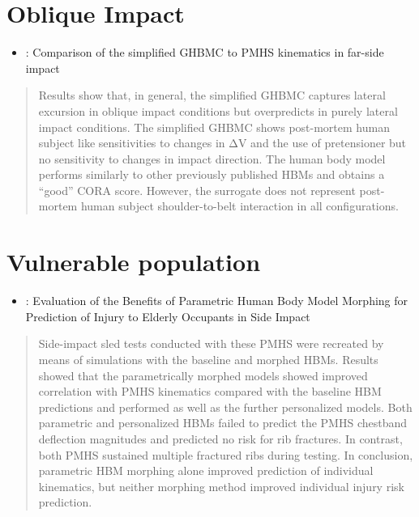 \documentclass[]{book}
\providecommand{\tightlist}{%
  \setlength{\itemsep}{0pt}\setlength{\parskip}{0pt}}
\begin{document}
\citep{Hwang2019}

\hypertarget{oblique-impact}{%
\section{Oblique Impact}\label{oblique-impact}}

\begin{itemize}
\tightlist
\item
  \citet{Perez-rapela2019}: Comparison of the simplified GHBMC to PMHS kinematics in far-side impact
\end{itemize}

\begin{quote}
Results show that, in general, the simplified GHBMC captures lateral excursion in oblique impact conditions but overpredicts in purely lateral impact conditions. The simplified GHBMC shows post-mortem human subject like sensitivities to changes in ΔV and the use of pretensioner but no sensitivity to changes in impact direction. The human body model performs similarly to other previously published HBMs and obtains a ``good'' CORA score. However, the surrogate does not represent post-mortem human subject shoulder-to-belt interaction in all configurations.
\end{quote}

\hypertarget{vulnerable-population}{%
\section{Vulnerable population}\label{vulnerable-population}}

\begin{itemize}
\tightlist
\item
  \citet{Larsson2019}: Evaluation of the Benefits of Parametric Human Body Model Morphing for Prediction of Injury to Elderly Occupants in Side Impact
\end{itemize}

\begin{quote}
Side-impact sled tests conducted with these PMHS were recreated by means of simulations with the baseline and morphed HBMs. Results showed that the parametrically morphed models showed improved correlation with PMHS kinematics compared with the baseline HBM predictions and performed as well as the further personalized models. Both parametric and personalized HBMs failed to predict the PMHS chestband deflection magnitudes and predicted no risk for rib fractures. In contrast, both PMHS sustained multiple fractured ribs during testing. In conclusion, parametric HBM morphing alone improved prediction of individual kinematics, but neither morphing method improved individual injury risk prediction.
\end{quote}
\end{document}
